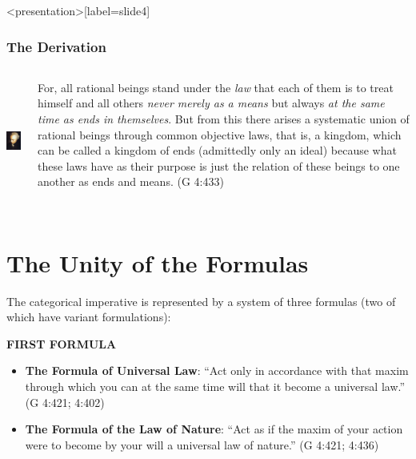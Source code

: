 \begin{frame}<presentation>[label=slide4]
    \frametitle{The Derivation}
        \begin{columns}
            \begin{column}{3cm}
                \includegraphics[height=4cm]{../../graphics/kant.jpg}
            \end{column}
            \begin{column}{7cm}
                For, all rational beings stand under the \emph{law} that each of them is to treat himself and all others \emph{never merely as a means} but always \emph{at the same time as ends in themselves}. But from this there arises a systematic union of rational beings through common objective laws, that is, a kingdom, which can be called a kingdom of ends (admittedly only an ideal) because what these laws have as their purpose is just the relation of these beings to one another as ends and means. (G 4:433)
            \end{column}
        \end{columns}
\end{frame}

\section{The Unity of the Formulas}

The categorical imperative is represented by a system of three formulas (two of which have variant formulations):

\textbf{FIRST FORMULA}

\begin{itemize}
    \item \textbf{The Formula of Universal Law}: ``Act only in accordance with that maxim through which you can at the same time will that it become a universal law.'' (G 4:421; 4:402)
    \item \textbf{The Formula of the Law of Nature}: ``Act as if the maxim of your action were to become by your will a universal law of nature.'' (G 4:421; 4:436)
\end{itemize}

